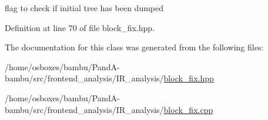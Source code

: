flag to check if initial tree has been dumped 



Definition at line 70 of file block\+\_\+fix.\+hpp.



The documentation for this class was generated from the following files\+:\begin{DoxyCompactItemize}
\item 
/home/osboxes/bambu/\+Pand\+A-\/bambu/src/frontend\+\_\+analysis/\+I\+R\+\_\+analysis/\hyperlink{block__fix_8hpp}{block\+\_\+fix.\+hpp}\item 
/home/osboxes/bambu/\+Pand\+A-\/bambu/src/frontend\+\_\+analysis/\+I\+R\+\_\+analysis/\hyperlink{block__fix_8cpp}{block\+\_\+fix.\+cpp}\end{DoxyCompactItemize}
